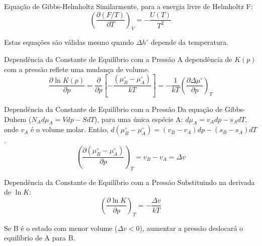 \documentclass{beamer}
\begin{document}
\begin{frame}{Equação de Gibbs-Helmholtz}
    Similarmente, para a energia livre de Helmholtz F:
    $$ \left(\frac{\partial (F/T)}{\partial T}\right)_V = -\frac{U(T)}{T^2} $$
    
    Estas equações são válidas mesmo quando $\Delta h^{\circ}$ depende da temperatura.
\end{frame}

\begin{frame}{Dependência da Constante de Equilíbrio com a Pressão}
    A dependência de $K(p)$ com a pressão reflete uma mudança de volume.
    $$ \frac{\partial \ln K(p)}{\partial p} = \frac{\partial}{\partial p}\left[-\frac{(\mu_B^{\circ} - \mu_A^{\circ})}{kT}\right] = -\frac{1}{kT}\left(\frac{\partial \Delta\mu^{\circ}}{\partial p}\right)_T $$
     
\end{frame}

\begin{frame}{Dependência da Constante de Equilíbrio com a Pressão}
    Da equação de Gibbs-Duhem ($N_A d\mu_A = Vdp - SdT$), para uma única espécie A: $d\mu_A = v_A dp - s_A dT$, onde $v_A$ é o volume molar.
    Então, $d(\mu_B^{\circ} - \mu_A^{\circ}) = (v_B - v_A)dp - (s_B - s_A)dT$.
    $$ \left(\frac{\partial(\mu_B^{\circ} - \mu_A^{\circ})}{\partial p}\right)_T = v_B - v_A = \Delta v $$
     
\end{frame}

\begin{frame}{Dependência da Constante de Equilíbrio com a Pressão}
    Substituindo na derivada de $\ln K$:
    $$ \left(\frac{\partial \ln K}{\partial p}\right)_T = -\frac{\Delta v}{kT} $$
    
    Se B é o estado com menor volume ($\Delta v < 0$), aumentar a pressão deslocará o equilíbrio de A para B.
\end{frame}

\end{document}
